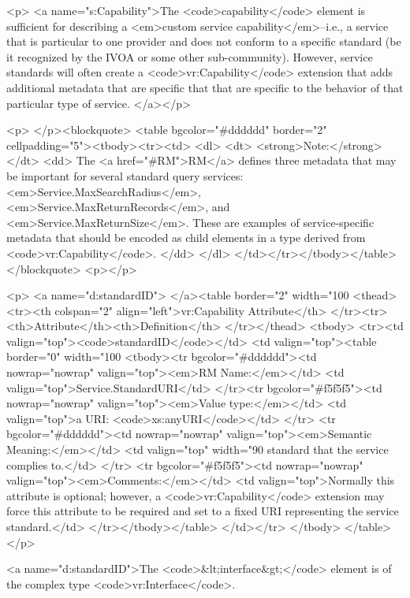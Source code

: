 \documentclass[11pt,a4paper]{ivoa}
\begin{document}
<p>
<a name="s:Capability">The <code>capability</code> element is sufficient for describing a
<em>custom service capability</em>--i.e., a service that is
particular to one provider and does not conform to a specific standard 
(be it recognized by the IVOA or some other sub-community).  However,
service standards will often create a <code>vr:Capability</code>
extension that adds additional metadata that are specific that that
are specific to the behavior of that particular type of service.  
</a></p>

<p>
</p><blockquote>
<table bgcolor="#dddddd" border="2" cellpadding="5"><tbody><tr><td>
<dl>
  <dt> <strong>Note:</strong> </dt>
  <dd> The <a href="#RM">RM</a> defines three metadata that may be
       important for several standard query services:
       <em>Service.MaxSearchRadius</em>,
       <em>Service.MaxReturnRecords</em>, and
       <em>Service.MaxReturnSize</em>.  These are examples of
       service-specific metadata that should be encoded as child
       elements in a type derived from <code>vr:Capability</code>.  
       </dd>
</dl>
</td></tr></tbody></table>
</blockquote>
<p></p>

<p>
<a name="d:standardID">
</a><table border="2" width="100%
<thead>
  <tr><th colspan="2" align="left">vr:Capability Attribute</th>
  </tr><tr><th>Attribute</th><th>Definition</th>
</tr></thead>
<tbody>
  <tr><td valign="top"><code>standardID</code></td>
      <td valign="top"><table border="0" width="100%
          <tbody><tr bgcolor="#dddddd"><td nowrap="nowrap" valign="top"><em>RM Name:</em></td>
              <td valign="top">Service.StandardURI</td>
          </tr><tr bgcolor="#f5f5f5"><td nowrap="nowrap" valign="top"><em>Value type:</em></td>
              <td valign="top">a URI:  <code>xs:anyURI</code></td>
          </tr>
          <tr bgcolor="#dddddd"><td nowrap="nowrap" valign="top"><em>Semantic Meaning:</em></td>
              <td valign="top" width="90%
standard that the service complies to.</td> 
          </tr>
          <tr bgcolor="#f5f5f5"><td nowrap="nowrap" valign="top"><em>Comments:</em></td>
              <td valign="top">Normally this attribute is optional; 
                  however, a <code>vr:Capability</code> extension may
                  force this attribute to be required and set to a
                  fixed URI representing the service standard.</td> 
          </tr></tbody></table>
      </td></tr>
</tbody>
</table>
</p>

<a name="d:standardID">The <code>&lt;interface&gt;</code> element is of the complex type 
<code>vr:Interface</code>.
\end{document}

